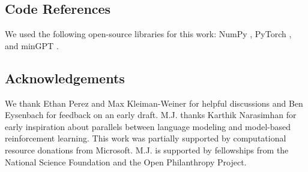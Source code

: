 \subsection*{Code References}
We used the following open-source libraries for this work: NumPy \citep{harris2020numpy}, PyTorch \citep{paszke2019pytorch}, and minGPT \citep{karpathy2020mingpt}.

\subsection*{Acknowledgements}
We thank Ethan Perez and Max Kleiman-Weiner for helpful discussions and Ben Eysenbach for feedback on an early draft.
M.J. thanks Karthik Narasimhan for early inspiration about parallels between language modeling and model-based reinforcement learning.
This work was partially supported by computational resource donations from Microsoft.
M.J. is supported by fellowships from the National Science Foundation and the Open Philanthropy Project.